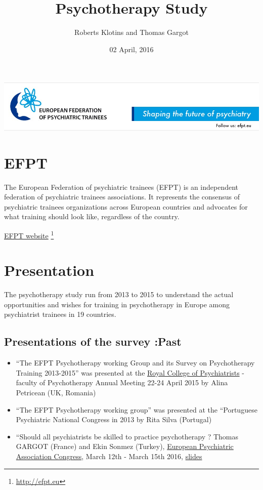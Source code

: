 \documentclass[]{tufte-handout}
\title{Psychotherapy Study}
\author{Roberts Klotins and Thomas Gargot}
\date{02 April, 2016}
\providecommand{\tightlist}{%
  \setlength{\itemsep}{0pt}\setlength{\parskip}{0pt}}
\begin{document}
\maketitle




\includegraphics{./cropped-banner_efpt.jpg} \tableofcontents

\section{EFPT}\label{efpt}

The European Federation of psychiatric trainees (EFPT) is an independent
federation of psychiatric trainees associations. It represents the
consensus of psychiatric trainees organizations across European
countries and advocates for what training should look like, regardless
of the country.

\href{http://efpt.eu/}{EFPT website} \footnote{\url{http://efpt.eu}}

\section{Presentation}\label{presentation}

The psychotherapy study run from 2013 to 2015 to understand the actual
opportunities and wishes for training in psychotherapy in Europe among
psychiatrist trainees in 19 countries.

\subsection{Presentations of the survey
:Past}\label{presentations-of-the-survey-past}

\begin{itemize}
\tightlist
\item
  ``The EFPT Psychotherapy working Group and its Survey on Psychotherapy
  Training 2013-2015'' was presented at the
  \href{http://www.rcpsych.ac.uk/pdf/CALC_MedPsych2015confbooklet.pdf}{Royal
  College of Psychiatrists} - faculty of Psychotherapy Annual Meeting
  22-24 April 2015 by Alina Petricean (UK, Romania)
\item
  ``The EFPT Psychotherapy working group'' was presented at the
  ``Portuguese Psychiatric National Congress in 2013 by Rita Silva
  (Portugal)
\item
  ``Should all psychiatrists be skilled to practice psychotherapy ?
  Thomas GARGOT (France) and Ekin Sonmez (Turkey),
  \href{http://efpt.eu/events/european-psychiatric-association-congress/}{European
  Psychiatric Association Congress}, March 12th - March 15th 2016,
  \href{http://efpt.eu/wp-content/uploads/2014/07/ES_TG_EPA_Psychotherapy.pdf}{slides}
\end{itemize}
\end{document}
